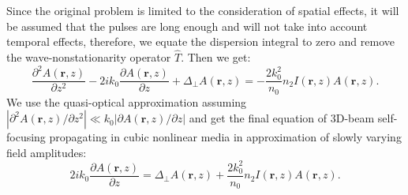 \documentclass[a4paper, 12pt]{article}
\begin{document}
Since the original problem is limited to the consideration of spatial effects, it will be assumed that the pulses are long enough and will not take into account temporal effects, therefore, we equate the dispersion integral to zero and remove the wave-nonstationarity operator $\hat{T}$. Then we get:
\begin{equation}
\label{approx_final}
\frac{\partial^2 A (\mathbf{r}, z)}{\partial z^2} - 2 i k_0 \frac{\partial A (\mathbf{r}, z)}{\partial z} + \Delta_{\perp} A (\mathbf{r}, z)= - \frac{2 k_0^2}{n_0} n_2 I(\mathbf{r}, z) A(\mathbf{r}, z).
\end{equation}
We use the quasi-optical approximation assuming $| \partial^2 A(\mathbf{r}, z) / \partial z^2| \ll k_0 |\partial A(\mathbf{r},z) / \partial z|$ and get the final equation of 3D-beam self-focusing  propagating in cubic nonlinear media in approximation of slowly varying field amplitudes:
\begin{equation}
\label{final}
2 i k_0 \frac{\partial A (\mathbf{r}, z)}{\partial z} = \Delta_{\perp} A (\mathbf{r}, z) + \frac{2 k_0^2}{n_0} n_2 I(\mathbf{r}, z) A(\mathbf{r}, z).
\end{equation}
\end{document}
